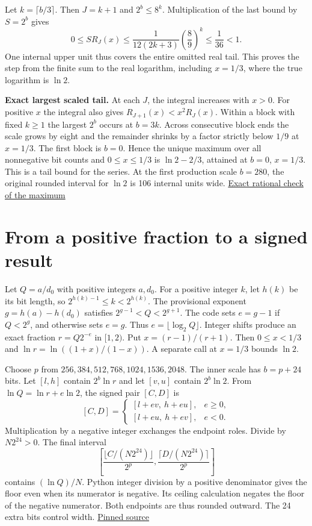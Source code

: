 Let \(k=\lceil b/3\rceil\). Then \(J=k+1\) and \(2^b\le8^k\). Multiplication of the last bound by \(S=2^b\) gives \[
0\le S R_J(x)\le \frac{1}{12(2k+3)}\left(\frac{8}{9}\right)^k
\le\frac{1}{36}<1.
\] One internal upper unit thus covers the entire omitted real tail. This proves the step from the finite sum to the real logarithm, including \(x=1/3\), where the true logarithm is \(\ln 2\).

\textbf{Exact largest scaled tail.} At each \(J\), the integral increases with \(x>0\). For positive \(x\) the integral also gives \(R_{J+1}(x)<x^2 R_J(x)\). Within a block with fixed \(k\ge1\) the largest \(2^b\) occurs at \(b=3k\). Across consecutive block ends the scale grows by eight and the remainder shrinks by a factor strictly below \(1/9\) at \(x=1/3\). The first block is \(b=0\). Hence the unique maximum over all nonnegative bit counts and \(0\le x\le1/3\) is \(\ln2-2/3\), attained at \(b=0\), \(x=1/3\). This is a tail bound for the series. At the first production scale \(b=280\), the original rounded interval for \(\ln2\) is 106 internal units wide. \href{https://github.com/sepahead/pid-rs/blob/main/audit/research/signed-log-certificate-enclosure/numerical/tail.json}{Exact rational check of the maximum}

\clearpage

\section{From a positive fraction to a signed result}\label{from-a-positive-fraction-to-a-signed-result}

Let \(Q=a/d_0\) with positive integers \(a,d_0\). For a positive integer \(k\), let \(h(k)\) be its bit length, so \(2^{h(k)-1}\le k<2^{h(k)}\). The provisional exponent \(g=h(a)-h(d_0)\) satisfies \(2^{g-1}<Q<2^{g+1}\). The code sets \(e=g-1\) if \(Q<2^g\), and otherwise sets \(e=g\). Thus \(e=\lfloor\log_2 Q\rfloor\). Integer shifts produce an exact fraction \(r=Q2^{-e}\) in \([1,2)\). Put \(x=(r-1)/(r+1)\). Then \(0\le x<1/3\) and \(\ln r=\ln((1+x)/(1-x))\). A separate call at \(x=1/3\) bounds \(\ln2\).

Choose \(p\) from \(256,384,512,768,1024,1536,2048\). The inner scale has \(b=p+24\) bits. Let \([l,h]\) contain \(2^b\ln r\) and let \([v,u]\) contain \(2^b\ln2\). From \(\ln Q=\ln r+e\ln2\), the signed pair \([C,D]\) is \[
[C,D]=\begin{cases}
[l+e v,\ h+e u], & e\ge0,\\
[l+e u,\ h+e v], & e<0 .
\end{cases}
\] Multiplication by a negative integer exchanges the endpoint roles. Divide by \(N2^{24}>0\). The final interval \[
\left[\frac{\lfloor C/(N2^{24})\rfloor}{2^p},
      \frac{\lceil D/(N2^{24})\rceil}{2^p}\right]
\] contains \((\ln Q)/N\). Python integer division by a positive denominator gives the floor even when its numerator is negative. Its ceiling calculation negates the floor of the negative numerator. Both endpoints are thus rounded outward. The 24 extra bits control width. \href{https://github.com/sepahead/pid-rs/blob/main/audit/research/three-source-six-certificate-observations/arithmetic.py}{Pinned source}

